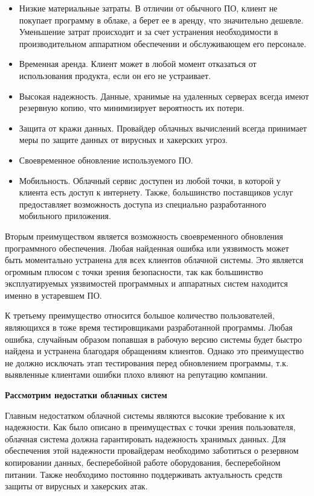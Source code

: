 \begin{itemize}
	\item Низкие материальные затраты. В отличии от обычного ПО, клиент не покупает программу в облаке, а берет ее в аренду, что значительно дешевле. Уменьшение затрат происходит и за счет устранения необходимости в производительном аппаратном обеспечении и обслуживающем его персонале.

	\item Временная аренда. Клиент может в любой момент отказаться от использования продукта, если он его не устраивает.

	\item Высокая надежность. Данные, хранимые на удаленных серверах всегда имеют резервную копию, что минимизирует вероятность их потери.

	\item Защита от кражи данных. Провайдер облачных вычислений всегда принимает меры по защите данных от вирусных и хакерских угроз.

	\item Своевременное обновление используемого ПО.

	\item Мобильность. Облачный сервис доступен из любой точки, в которой у клиента есть доступ к интернету.  Также, большинство поставщиков услуг предоставляет возможность доступа из специально разработанного мобильного приложения.
\end{itemize}

Вторым преимуществом является возможность своевременного обновления программного обеспечения. Любая найденная ошибка или уязвимость может быть моментально устранена для всех клиентов облачной системы. Это является огромным плюсом с точки зрения безопасности, так как большинство эксплуатируемых уязвимостей программных и аппаратных систем находится именно в устаревшем ПО.

К третьему преимущество относится большое количество пользователей, являющихся в тоже время тестировщиками разработанной программы. Любая ошибка, случайным образом попавшая в рабочую версию системы будет быстро найдена и устранена благодаря обращениям клиентов. Однако это преимущество не должно исключать этап тестирования перед обновлением программы, т.к. выявленные клиентами ошибки плохо влияют на репутацию компании.

\textbf{Рассмотрим недостатки облачных систем}

Главным недостатком облачной системы являются высокие требование к их надежности. Как было описано в преимуществах с точки зрения пользователя, облачная система должна гарантировать надежность хранимых данных. Для обеспечения этой надежности провайдерам необходимо заботиться о резервном копировании данных, бесперебойной работе оборудования, бесперебойном питании. Также необходимо постоянно поддерживать актуальность средств защиты от вирусных и хакерских атак.

